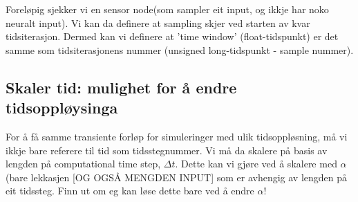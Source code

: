 		Foreløpig sjekker vi en sensor node(som sampler eit input, og ikkje har noko neuralt input).
		Vi kan da definere at sampling skjer ved starten av kvar tidsiterasjon.
		Dermed kan vi definere at 'time window' (float-tidspunkt) er det samme som tidsiterasjonens nummer (unsigned long-tidspunkt - sample nummer).

	\subsection{Skaler tid: mulighet for å endre tidsoppløysinga}
	For å få samme transiente forløp for simuleringer med ulik tidsoppløsning, må vi ikkje bare referere til tid som tidsstegnummer. 
	Vi må da skalere på basis av lengden på computational time step, $\Delta t$.
	Dette kan vi gjøre ved å skalere med $\alpha$ (bare lekkasjen [OG OGSÅ MENGDEN INPUT] som er avhengig av lengden på eit tidssteg.
	Finn ut om eg kan løse dette bare ved å endre $\alpha$!
